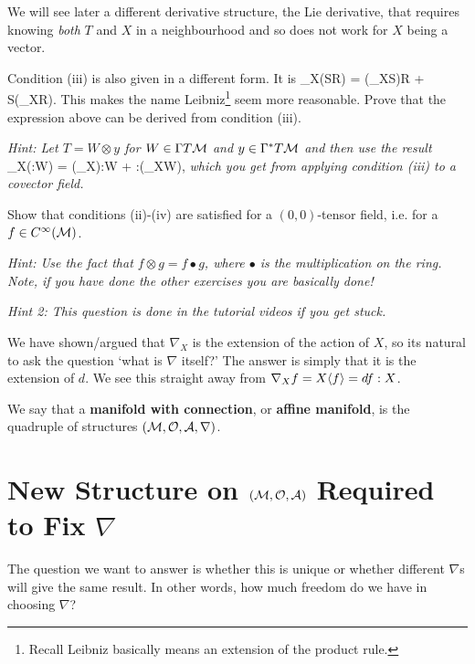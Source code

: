 We will see later a different derivative structure, the Lie derivative, that requires knowing \textit{both} $T$ and $X$ in a neighbourhood and so does not work for $X$ being a vector. 

\bbox
    Condition (iii) is also given in a different form. It is
    \bse 
        \nabla_X(S\otimes R) = (\nabla_XS)\otimes R + S\otimes (\nabla_XR).
    \ese
    This makes the name Leibniz\footnote{Recall Leibniz basically means an extension of the product rule.} seem more reasonable. Prove that the expression above can be derived from condition (iii). 
    
    \textit{Hint: Let $T=W\otimes y$ for $W\in\Gamma T\mathcal{M}$ and $y\in \Gamma^*T\mathcal{M}$ and then use the result}
    \bse 
        \nabla_X(\omega:W) = (\nabla_X\omega):W + \omega:(\nabla_XW),
    \ese 
    \textit{which you get from applying condition (iii) to a covector field.}
\ebox

\bbox 
    Show that conditions (ii)-(iv) are satisfied for a $(0,0)$-tensor field, i.e. for a $f\in C^{\infty}(\mathcal{M})$.
    
    \textit{Hint: Use the fact that $f\otimes g = f\bullet g$, where $\bullet$ is the multiplication on the ring. Note, if you have done the other exercises you are basically done!}
    
    \textit{Hint 2: This question is done in the tutorial videos if you get stuck.}
\ebox  

\br 
    We have shown/argued that $\nabla_X$ is the extension of the action of $X$, so its natural to ask the question `what is $\nabla$ itself?' The answer is simply that it is the extension of $d$. We see this straight away from $\nabla_Xf = X\langle f\rangle = df:X$.
\er 

    We say that a \textbf{manifold with connection}, or \textbf{affine manifold}, is the quadruple of structures $(\mathcal{M},\mathcal{O},\mathcal{A},\nabla)$.
\ed 

\section{New Structure on $(\mathcal{M},\mathcal{O},\mathcal{A})$ Required to Fix $\nabla$}

The question we want to answer is whether this is unique or whether different $\nabla$s will give the same result. In other words, how much freedom do we have in choosing $\nabla$?

